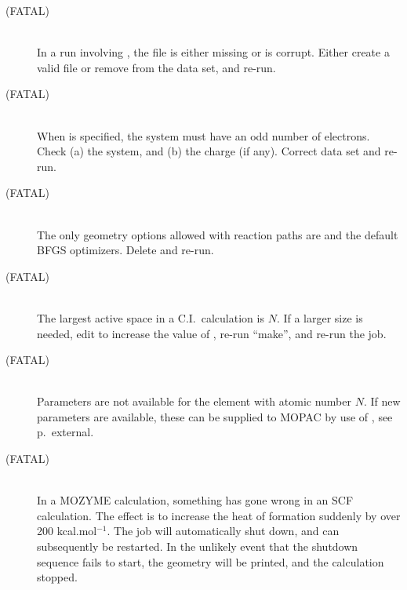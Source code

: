 \begin{description}
\item[ (FATAL)]~\\
In a run involving , the  file  is either missing
or is corrupt.  Either create a valid  file or remove 
from the data set, and re-run.
 
\item[ (FATAL)]~\\
When  is specified, the system must have an odd number of  
electrons.  Check (a) the system, and (b) the charge (if any).  Correct 
data set and re-run. 
 
\item[ (FATAL)]~\\
The only geometry options allowed with reaction paths are  and
the default BFGS optimizers.  Delete  and re-run.
 
\item[ (FATAL)]~\\
The largest active space in a C.I.\ calculation is $N$.  If a larger size is
needed, edit  to increase the value of , re-run ``make'',
and re-run the job.

\item[ (FATAL)]~\\
Parameters are not available for the element with atomic number $N$. If
new parameters are available, these can be supplied to MOPAC by use of
\hyperref[pageref]{}{, see p.~}{}{external}.

\item[ (FATAL)]~\\
In a MOZYME calculation, something has gone wrong in an SCF calculation.
The effect is to increase the heat of formation suddenly by over 200 
kcal.mol$^{-1}$.  The job will automatically shut down, and can subsequently
be restarted.  In the unlikely event that the shutdown sequence fails to start,
the geometry will be printed, and the calculation stopped.


\end{description}
